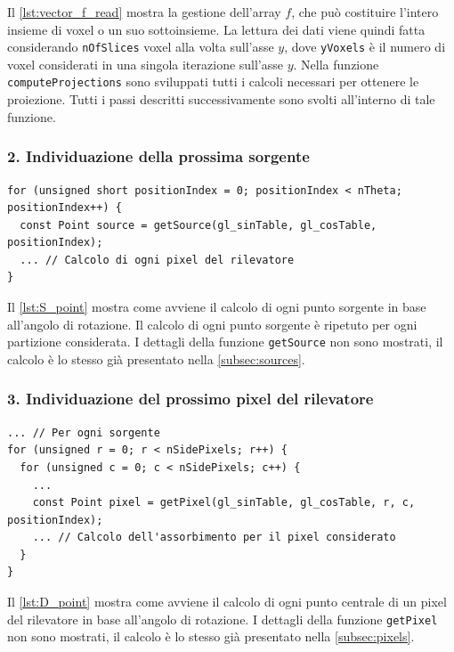 \documentclass[12pt,a4paper]{report}
\begin{document}
Il \autoref{lst:vector_f_read} mostra la gestione dell'array \(f\), che può costituire l'intero insieme di voxel o un suo
sottoinsieme.
La lettura dei dati viene quindi fatta considerando \lstinline{nOfSlices} voxel alla volta sull'asse \(y\), dove
\lstinline{yVoxels} è il numero di voxel considerati in una singola iterazione sull'asse \(y\).
Nella funzione \lstinline{computeProjections} sono sviluppati tutti i calcoli necessari per ottenere le proiezione.
Tutti i passi descritti successivamente sono svolti all'interno di tale funzione.

\subsubsection{2. Individuazione della prossima sorgente}

\begin{lstlisting}[language=CStyle, caption={Codice C per l'individuazione di un punto sorgente.}, label={lst:S_point}]
for (unsigned short positionIndex = 0; positionIndex < nTheta; positionIndex++) {
  const Point source = getSource(gl_sinTable, gl_cosTable, positionIndex);
  ... // Calcolo di ogni pixel del rilevatore
}
\end{lstlisting}

Il \autoref{lst:S_point} mostra come avviene il calcolo di ogni punto sorgente in base all'angolo di rotazione.
Il calcolo di ogni punto sorgente è ripetuto per ogni partizione considerata.
I dettagli della funzione \lstinline{getSource} non sono mostrati, il calcolo è lo stesso già presentato nella
\autoref{subsec:sources}.

\subsubsection{3. Individuazione del prossimo pixel del rilevatore}

\begin{lstlisting}[language=CStyle, caption={Codice C per l'individuazione di un pixel del rilevatore.}, label={lst:D_point}]
... // Per ogni sorgente
for (unsigned r = 0; r < nSidePixels; r++) {
  for (unsigned c = 0; c < nSidePixels; c++) {
    ...
    const Point pixel = getPixel(gl_sinTable, gl_cosTable, r, c, positionIndex);
    ... // Calcolo dell'assorbimento per il pixel considerato
  }
}
\end{lstlisting}

Il \autoref{lst:D_point} mostra come avviene il calcolo di ogni punto centrale di un pixel del rilevatore in base all'angolo di
rotazione.
I dettagli della funzione \lstinline{getPixel} non sono mostrati, il calcolo è lo stesso già presentato nella
\autoref{subsec:pixels}.
\end{document}
